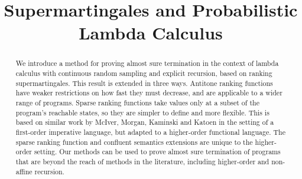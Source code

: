 \documentclass[conference]{IEEEtran}
\begin{document}
\title{Supermartingales and Probabilistic Lambda Calculus}


\maketitle

\begin{abstract}
We introduce a method for proving almost sure termination in the context of lambda calculus with continuous random sampling and explicit recursion, based on ranking supermartingales. 
This result is extended in three ways. 
Antitone ranking functions have weaker restrictions on how fast they must decrease, and are applicable to a wider range of programs. 
Sparse ranking functions take values only at a subset of the program's reachable states, so they are simpler to define and more flexible. 
This is based on similar work by McIver, Morgan, Kaminski and Katoen in the setting of a first-order imperative language, but adapted to a higher-order functional language.
The sparse ranking function and confluent semantics extensions are unique to the higher-order setting.
Our methods can be used to prove almost sure termination of programs that are beyond the reach of methods in the literature, including higher-order and non-affine recursion.
\end{abstract}

\IEEEpeerreviewmaketitle

















%


\end{document}
